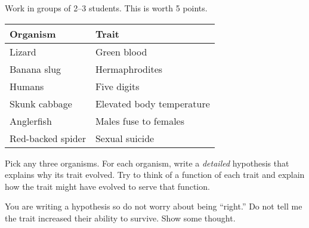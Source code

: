 \documentclass[t]{beamer}
\begin{document}
%
\begin{frame}{Work in groups of 2–3 students. This is worth 5 points.}

\hspace{1em}\begin{tabular}{@{}ll@{}}
\toprule
Organism			& Trait \\
\midrule
Lizard				& Green blood \\
Banana slug			& Hermaphrodites \\
Humans				& Five digits \\
Skunk cabbage		& Elevated body temperature \\
Anglerfish			& Males fuse to females \\
Red-backed spider	& Sexual suicide \\
\bottomrule
\end{tabular}

\smallskip

\hangpara Pick any three organisms. For each organism, write a \emph{detailed} hypothesis that explains why its trait evolved. Try to think of a function of each trait and explain how the trait might have evolved to serve that function.

\hangpara You are writing a hypothesis so do not worry about being “right.” Do not tell me the trait increased their ability to survive. Show some thought.

\end{frame}
%
\end{document}
